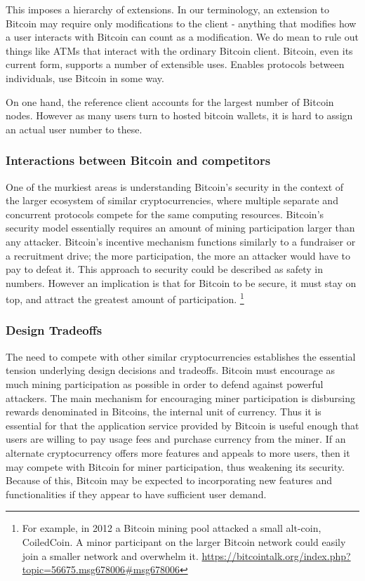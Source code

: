 This imposes a hierarchy of extensions. In our terminology, an extension to Bitcoin may require only modifications to the client - anything that modifies how a user interacts with Bitcoin can count as a modification. We do mean to rule out things like ATMs that interact with the ordinary Bitcoin client. Bitcoin, even its current form, supports a number of extensible uses. Enables protocols between individuals, use Bitcoin in some way.

On one hand, the reference client accounts for the largest number of Bitcoin nodes. However as many users turn to hosted bitcoin wallets, it is hard to assign an actual user number to these.

\subsubsection{Interactions between Bitcoin and competitors}
One of the murkiest areas is understanding Bitcoin's security in the context of the larger ecosystem of similar cryptocurrencies, where multiple separate and concurrent protocols compete for the same computing resources. Bitcoin's security model essentially requires an amount of mining participation larger than any attacker. Bitcoin's incentive mechanism functions similarly to a fundraiser or a recruitment drive; the more participation, the more an attacker would have to pay to defeat it. This approach to security could be described as safety in numbers. However an implication is that for Bitcoin to be secure, it must stay on top, and attract the greatest amount of participation. \footnote{For example, in 2012 a Bitcoin mining pool attacked a small alt-coin, CoiledCoin. A minor participant on the larger Bitcoin network could easily join a smaller network and overwhelm it. \url{https://bitcointalk.org/index.php?topic=56675.msg678006#msg678006}} 

\subsubsection{Design Tradeoffs}
The need to compete with other similar cryptocurrencies establishes the essential tension underlying design decisions and tradeoffs. Bitcoin must encourage as much mining participation as possible in order to defend against powerful attackers. The main mechanism for encouraging miner participation is disbursing rewards denominated in Bitcoins, the internal unit of currency. Thus it is essential for that the application service provided by Bitcoin is useful enough that users are willing to pay usage fees and purchase currency from the miner. If an alternate cryptocurrency offers more features and appeals to more users, then it may compete with Bitcoin for miner participation, thus weakening its security. Because of this, Bitcoin may be expected to incorporating new features and functionalities if they appear to have sufficient user demand.

